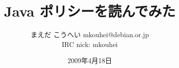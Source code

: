 




\documentclass[cjk,dvipdfmx,12pt]{beamer}
\usepackage{monthlypresentation}



\title{Java ポリシーを読んでみた}
\author{まえだ こうへい mkouhei@debian.or.jp\\IRC nick: mkouhei}
\date{2009年4月18日}



